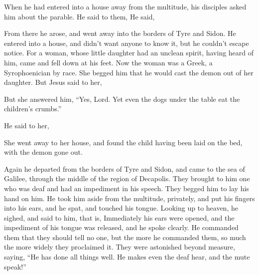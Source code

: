 {{{}}
\par }{\PP {}When he had entered into a house away from the multitude, his disciples asked him about the parable.
He said to them,
{}
He said,
{}
\par }{\PP {}From there he arose, and went away into the borders of Tyre and Sidon. He entered into a house, and didn’t want anyone to know it, but he couldn’t escape notice.
For a woman, whose little daughter had an unclean spirit, having heard of him, came and fell down at his feet.
Now the woman was a Greek, a Syrophoenician by race. She begged him that he would cast the demon out of her daughter.
But Jesus said to her,
{}
\par }{\PP {}But she answered him, “Yes, Lord. Yet even the dogs under the table eat the children’s crumbs.”
\par }{\PP {}He said to her,
{}
\par }{\PP {}She went away to her house, and found the child having been laid on the bed, with the demon gone out.
\par }{\PP {}Again he departed from the borders of Tyre and Sidon, and came to the sea of Galilee, through the middle of the region of Decapolis.
They brought to him one who was deaf and had an impediment in his speech. They begged him to lay his hand on him.
He took him aside from the multitude, privately, and put his fingers into his ears, and he spat, and touched his tongue.
Looking up to heaven, he sighed, and said to him,
{} that is,
{}
Immediately his ears were opened, and the impediment of his tongue was released, and he spoke clearly.
He commanded them that they should tell no one, but the more he commanded them, so much the more widely they proclaimed it.
They were astonished beyond measure, saying, “He has done all things well. He makes even the deaf hear, and the mute speak!”

}
